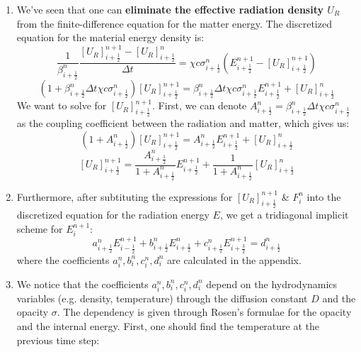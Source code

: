 \documentclass[11pt]{article}
\begin{document}
\begin{enumerate}
  \subsubsection{Solution of the discretized system of equations}
  \item We've seen that one can \textbf{eliminate the effective radiation density $U_R$} from the finite-difference equation for the matter energy. The discretized equation for the material energy density is:
  \begin{equation}
      \frac{1}{ \beta_{i+\frac{1}{2}}^{n}}\frac{[U_R]_{i+\frac{1}{2}}^{n+1} - [U_R]_{i+\frac{1}{2}}^n}{\Delta t} = \chi c \sigma_{i+\frac{1}{2}}^{n} (E_{i+\frac{1}{2}}^{n+1} - [U_R]_{i+\frac{1}{2}}^{n+1})
  \end{equation}
  \begin{equation}
      (1 +  \beta_{i+\frac{1}{2}}^{n} \Delta t \chi c \sigma_{i+\frac{1}{2}}^{n}) [U_R]_{i+\frac{1}{2}}^{n+1} =  \beta_{i+\frac{1}{2}}^{n}\Delta t \chi c \sigma_{i+\frac{1}{2}}^{n} E_{i+\frac{1}{2}}^{n+1} + [U_R]_{i+\frac{1}{2}}^n
  \end{equation}
  We want to solve for $[U_R]_{i+\frac{1}{2}}^{n+1}$. First, we can denote $A_{i+\frac{1}{2}}^n = \beta_{i+\frac{1}{2}}^{n} \Delta t \chi c \sigma_{i+\frac{1}{2}}^{n}$ as the coupling coefficient between the radiation and matter, which gives us:
  \begin{equation}
      (1 + A_{i+\frac{1}{2}}^n) [U_R]_{i+\frac{1}{2}}^{n+1} =  A_{i+\frac{1}{2}}^n E_{i+\frac{1}{2}}^{n+1} + [U_R]_{i+\frac{1}{2}}^n
  \end{equation}
  \begin{equation}
      \boxed{[U_R]_{i+\frac{1}{2}}^{n+1} = \frac{A_{i+\frac{1}{2}}^n}{1 + A_{i+\frac{1}{2}}^n} E_{i+\frac{1}{2}}^{n+1} + \frac{1}{1 + A_{i+\frac{1}{2}}^n}[U_R]_{i+\frac{1}{2}}^n}
  \end{equation}
  \item Furthermore, after subtituting the expressions for $[U_R]_{i+\frac{1}{2}}^{n+1}$ \& $F_i^{n}$ into the discretized equation for the radiation energy $E$, we get a tridiagonal implicit scheme for $E_i^{n+1}$:
  \begin{equation}
    \boxed{a_{i+\frac{1}{2}}^n E_{i-\frac{1}{2}}^{n+1}+b_{i+\frac{1}{2}}^n E_{i+\frac{1}{2}}^{n} +c_{i+\frac{1}{2}}^n E_{i+\frac{3}{2}}^{n+1}=d_{i+\frac{1}{2}}^n}
  \end{equation}
  where the coefficients $a_i^n,b_i^n,c_i^n,d_i^n$ are calculated in the appendix.
  \item We notice that the coefficients $a_{i}^n,b_{i}^n,c_{i}^n,d_{i}^n$ depend on the hydrodynamics variables (e.g. density, temperature) through the diffusion constant $D$ and the opacity $\sigma$. The dependency is given through Rosen's formulae for the opacity and the internal energy. First, one should find the temperature at the previous time step:

\end{enumerate}
\end{document}
